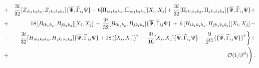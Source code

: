 \documentclass[a4paper,11pt]{article}
\begin{document}
\begin{eqnarray}
&+&\frac{3i}{32}[Z_{i k_1 k_2 k_3},Z_{j k_1 k_2 k_3}]\{\overline{\Psi },\widetilde{\Gamma }_{ij}\Psi\}-
6[\Pi_{i k_1 k_2 k_3},\Pi_{j k_1 k_2 k_3}][X_{i},X_{j}]+
\frac{3i}{32}[\Pi_{i k_1 k_2 k_3},\Pi_{j k_1 k_2 k_3}]\{\overline{\Psi },\widetilde{\Gamma }_{ij}\Psi\}+\nonumber\\
&+&18\,[B_{i k_1 k_2},B_{j k_1 k_2}][X_{i},X_{j}]\,-\,
\frac{9i}{32}[B_{i k_1 k_2},B_{j k_1 k_2}]\{\overline{\Psi },\widetilde{\Gamma }_{ij}\Psi\}\,+\,
6\,[H_{i k_1 k_2 k_3},H_{j k_1 k_2 k_3}][X_{i},X_{j}]\,-\nonumber\\
&-&\frac{3i}{32}[H_{i k_1 k_2 k_3},H_{j k_1 k_2 k_3}]\{\overline{\Psi },\widetilde{\Gamma }_{ij}\Psi\}+
18\,([X_{i},X_{j}])^{2}\,-\,\frac{9i}{16}[X_{i},X_{j}]\{\overline{\Psi },\widetilde{\Gamma }_{ij}\Psi\}-
\frac{9}{2^{11}}(\{\overline{\Psi},\widetilde{\Gamma }_{ij}\Psi\})^2\,\bigg\}+\nonumber\\
&+& {\cal O}(1/\beta^3) \Bigg)\,. \nonumber
\end{eqnarray}
\end{document}
